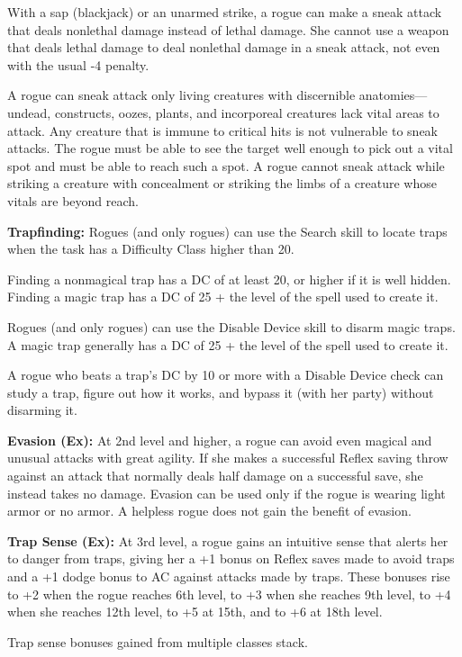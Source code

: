 With a sap (blackjack) or an unarmed strike, a rogue can make a sneak attack that deals nonlethal damage instead of lethal damage. She cannot use a weapon that deals lethal damage to deal nonlethal damage in a sneak attack, not even with the usual -4 penalty.

A rogue can sneak attack only living creatures with discernible anatomies—undead, constructs, oozes, plants, and incorporeal creatures lack vital areas to attack. Any creature that is immune to critical hits is not vulnerable to sneak attacks. The rogue must be able to see the target well enough to pick out a vital spot and must be able to reach such a spot. A rogue cannot sneak attack while striking a creature with concealment or striking the limbs of a creature whose vitals are beyond reach.

\textbf{Trapfinding:} Rogues (and only rogues) can use the Search skill to locate traps when the task has a Difficulty Class higher than 20.

Finding a nonmagical trap has a DC of at least 20, or higher if it is well hidden. Finding a magic trap has a DC of 25 + the level of the spell used to create it.

Rogues (and only rogues) can use the Disable Device skill to disarm magic traps. A magic trap generally has a DC of 25 + the level of the spell used to create it.

A rogue who beats a trap’s DC by 10 or more with a Disable Device check can study a trap, figure out how it works, and bypass it (with her party) without disarming it.

\textbf{Evasion (Ex):} At 2nd level and higher, a rogue can avoid even magical and unusual attacks with great agility. If she makes a successful Reflex saving throw against an attack that normally deals half damage on a successful save, she instead takes no damage. Evasion can be used only if the rogue is wearing light armor or no armor. A helpless rogue does not gain the benefit of evasion.

\textbf{Trap Sense (Ex):} At 3rd level, a rogue gains an intuitive sense that alerts her to danger from traps, giving her a +1 bonus on Reflex saves made to avoid traps and a +1 dodge bonus to AC against attacks made by traps. These bonuses rise to +2 when the rogue reaches 6th level, to +3 when she reaches 9th level, to +4 when she reaches 12th level, to +5 at 15th, and to +6 at 18th level.

Trap sense bonuses gained from multiple classes stack.


